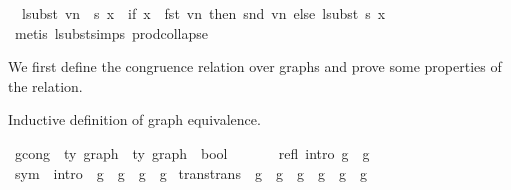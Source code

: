 \begin{isabellebody}
\ \ {\isachardoublequoteopen}lsubst\ {\isacharparenleft}{\kern0pt}vn\ {\isacharhash}{\kern0pt}\ s{\isacharparenright}{\kern0pt}\ x\ {\isacharequal}{\kern0pt}\ {\isacharparenleft}{\kern0pt}if\ x\ {\isacharequal}{\kern0pt}\ fst\ vn\ then\ snd\ vn\ else\ lsubst\ s\ x{\isacharparenright}{\kern0pt}{\isachardoublequoteclose}\isanewline
%
\isadelimproof
%
\endisadelimproof
%
\isatagproof
{}\isamarkupfalse%
\ {\isacharparenleft}{\kern0pt}metis\ lsubst{\isachardot}{\kern0pt}simps{\isacharparenleft}{\kern0pt}{}{\isacharparenright}{\kern0pt}\ prod{\isachardot}{\kern0pt}collapse{\isacharparenright}{\kern0pt}%
\endisatagproof
{\isafoldproof}%
%
\isadelimproof
%
\endisadelimproof
%
\isadelimdocument
%
\endisadelimdocument
%
\isatagdocument
%
\isamarkuptrue%
%
\endisatagdocument
{\isafolddocument}%
%
\isadelimdocument
%
\endisadelimdocument
%
\begin{isamarkuptext}%
We first define the congruence relation over graphs
and prove some properties of the relation.%
\end{isamarkuptext}\isamarkuptrue%
%
\begin{isamarkuptext}%
Inductive definition of graph equivalence.%
\end{isamarkuptext}\isamarkuptrue%
\isamarkupfalse%
\ gcong\ {\isacharcolon}{\kern0pt}{\isacharcolon}{\kern0pt}\ {\isachardoublequoteopen}{\isacharprime}{\kern0pt}ty\ graph\ {\isacharequal}{\kern0pt}{\isachargreater}{\kern0pt}\ {\isacharprime}{\kern0pt}ty\ graph\ {\isacharequal}{\kern0pt}{\isachargreater}{\kern0pt}\ bool{\isachardoublequoteclose}\ {\isacharparenleft}{\kern0pt}\ {\isachardoublequoteopen}{\isasymsimeq}{\isachardoublequoteclose}\ {}{}{\isacharparenright}{\kern0pt}\isanewline
{}\isanewline
\ \isanewline
\ \ refl\ {\isacharbrackleft}{\kern0pt}intro{\isacharbang}{\kern0pt}{\isacharbrackright}{\kern0pt}{\isacharcolon}{\kern0pt}\ {\isachardoublequoteopen}g\ {\isasymsimeq}\ g{\isachardoublequoteclose}\isanewline
{\isacharbar}{\kern0pt}\ sym\ \ {\isacharbrackleft}{\kern0pt}intro{\isacharbrackright}{\kern0pt}{\isacharcolon}{\kern0pt}\ \ {\isachardoublequoteopen}g{}\ {\isasymsimeq}\ g{}\ {\isacharequal}{\kern0pt}{\isacharequal}{\kern0pt}{\isachargreater}{\kern0pt}\ g{}\ {\isasymsimeq}\ g{}{\isachardoublequoteclose}\isanewline
{\isacharbar}{\kern0pt}\ trans{\isacharbrackleft}{\kern0pt}trans{\isacharbrackright}{\kern0pt}{\isacharcolon}{\kern0pt}\ \ {\isachardoublequoteopen}g{}\ {\isasymsimeq}\ g{}\ {\isacharequal}{\kern0pt}{\isacharequal}{\kern0pt}{\isachargreater}{\kern0pt}\ g{}\ {\isasymsimeq}\ g{}\ {\isacharequal}{\kern0pt}{\isacharequal}{\kern0pt}{\isachargreater}{\kern0pt}\ g{}\ {\isasymsimeq}\ g{}{\isachardoublequoteclose}\isanewline

\end{isabellebody}
